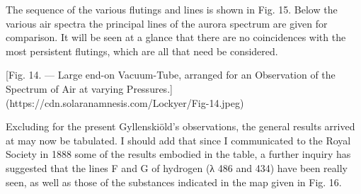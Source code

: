 \documentclass[a4paper, 12pt, oneside, polutonikogreek, english]{article}
\begin{document}
The sequence of the various flutings and lines is shown in Fig. 15. Below the various air spectra the principal lines of the aurora spectrum are given for comparison. It will be seen at a glance that there are no coincidences with the most persistent flutings, which are all that need be considered.

[Fig. 14. --- Large end-on Vacuum-Tube, arranged for an Observation of the Spectrum of Air at varying Pressures.](https://cdn.solaranamnesis.com/Lockyer/Fig-14.jpeg)

Excluding for the present Gyllenskiöld's observations, the general results arrived at may now be tabulated. I should add that since I communicated to the Royal Society in 1888 some of the results embodied in the table, a further inquiry has suggested that the lines F and G of hydrogen (λ 486 and 434) have been really seen, as well as those of the substances indicated in the map given in Fig. 16.
\clearpage
\end{document}

